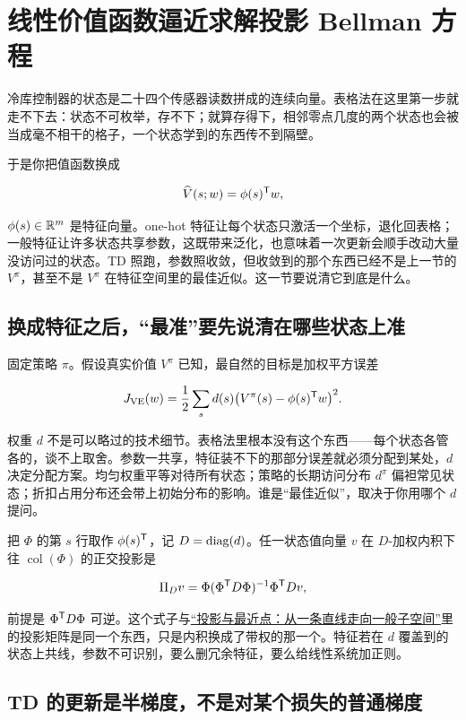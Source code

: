 \section{线性价值函数逼近求解投影 Bellman 方程}
\label{sec:16-Control-and-Reinforcement-Learning/02-Reinforcement-Learning/05}

冷库控制器的状态是二十四个传感器读数拼成的连续向量。表格法在这里第一步就走不下去：状态不可枚举，存不下；就算存得下，相邻零点几度的两个状态也会被当成毫不相干的格子，一个状态学到的东西传不到隔壁。

于是你把值函数换成

\[
\widehat V(s;w)=\phi(s)^{\mathsf{T}}w,
\]

\(\phi(s)\in\mathbb{R}^m\) 是特征向量。one-hot 特征让每个状态只激活一个坐标，退化回表格；一般特征让许多状态共享参数，这既带来泛化，也意味着一次更新会顺手改动大量没访问过的状态。TD 照跑，参数照收敛，但收敛到的那个东西已经不是上一节的 \(V^\pi\)，甚至不是 \(V^\pi\) 在特征空间里的最佳近似。这一节要说清它到底是什么。

\subsection{换成特征之后，``最准''要先说清在哪些状态上准}

固定策略 \(\pi\)。假设真实价值 \(V^\pi\) 已知，最自然的目标是加权平方误差

\[
J_{\mathrm{VE}}(w)
=\frac12\sum_s d(s)\bigl(V^\pi(s)-\phi(s)^{\mathsf{T}}w\bigr)^2 .
\]

权重 \(d\) 不是可以略过的技术细节。表格法里根本没有这个东西——每个状态各管各的，谈不上取舍。参数一共享，特征装不下的那部分误差就必须分配到某处，\(d\) 决定分配方案。均匀权重平等对待所有状态；策略的长期访问分布 \(d^\pi\) 偏袒常见状态；折扣占用分布还会带上初始分布的影响。谁是``最佳近似''，取决于你用哪个 \(d\) 提问。

把 \(\Phi\) 的第 \(s\) 行取作 \(\phi(s)^{\mathsf{T}}\)，记 \(D=\operatorname{diag}(d)\)。任一状态值向量 \(v\) 在 \(D\)-加权内积下往 \(\operatorname{col}(\Phi)\) 的正交投影是

\[
\Pi_Dv=\Phi(\Phi^{\mathsf{T}}D\Phi)^{-1}\Phi^{\mathsf{T}}Dv,
\]

前提是 \(\Phi^{\mathsf{T}}D\Phi\) 可逆。这个式子与\hyperref[sec:03-Linear-Algebra/03-Orthogonality/02]{``投影与最近点：从一条直线走向一般子空间''}里的投影矩阵是同一个东西，只是内积换成了带权的那一个。特征若在 \(d\) 覆盖到的状态上共线，参数不可识别，要么删冗余特征，要么给线性系统加正则。

\subsection{TD 的更新是半梯度，不是对某个损失的普通梯度}

